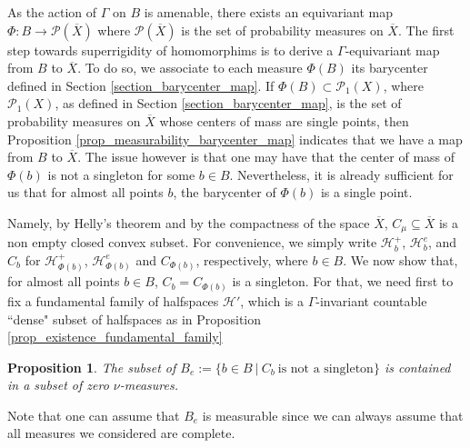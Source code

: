 \documentclass{amsart}
\numberwithin{equation}{section}
\newtheorem{prop}[thm]{Proposition}
\newcommand{\HH}{\mathcal{H}}     %
\newcommand{\hh}{\mathfrak{h}}    %
\newcommand{\PP}{\mathcal{P}}     %
\theoremstyle{definition}
\def\bar{\overline}
\begin{document}
As the action of $\Gamma$ on $B$ is amenable, there exists an equivariant map $\Phi:B\rightarrow \PP(\bar{X})$ where $\PP(\bar{X})$ is the set of probability measures on $\bar{X}$. The first step towards superrigidity of homomorphims is to derive a $\Gamma$-equivariant map from $B$ to $\bar{X}$. To do so, we associate to each measure $\Phi(B)$ its barycenter defined in Section \ref{section_barycenter_map}. If $\Phi(B) \subset \PP_1(X)$, where $\PP_1(X)$, as defined in Section \ref{section_barycenter_map}, is the set of probability measures on $\bar{X}$ whose centers of mass are single points, then Proposition \ref{prop_measurability_barycenter_map} indicates that we have a map from $B$ to $\bar{X}$. The issue however is that one may have that the center of mass of $\Phi(b)$ is not a singleton for some $b \in B$. Nevertheless, it is already sufficient for us that for almost all points $b$, the barycenter of $\Phi(b)$ is a single point.  \par


\par
Namely, by Helly's theorem and by the compactness of the space $\bar{X}$, $C_\mu \subseteq \bar{X}$ is a non empty closed convex subset.  For convenience, we simply write $\HH_b^+$, $\HH_b^e$, and $C_b$ for $\HH_{\Phi(b)}^+$, $\HH_{\Phi(b)}^e$ and $C_{\Phi(b)}$, respectively, where $b\in B$. We now show that, for almost all points $b \in B$, $C_b = C_{\Phi(b)}$ is a singleton. For that, we need first to fix a fundamental family of halfspaces $\HH'$, which is a $\Gamma$-invariant countable ``dense" subset of halfspaces as in Proposition \ref{prop_existence_fundamental_family}


\begin{prop}\label{prop_balanced_halfspaces_zero_measure}
The subset of $B_e:=\{b\in B\ |\ C_b\ \text{is not a singleton} \} $ is contained in a subset of zero $\nu$-measures.
\end{prop}
Note that one can assume that $B_e$ is measurable since we can always assume that all measures we considered are complete.
\end{document}
